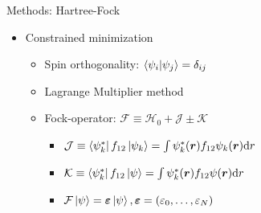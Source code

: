 \documentclass[10pt, t, xcolor=dvipsnames]{beamer}
\begin{document}
\begin{frame}[fragile]{Methods: Hartree-Fock}
    \begin{itemize}
        \item Constrained minimization
            \begin{itemize}
                \item Spin orthogonality: $\braket{\psi_i}{\psi_j} =
                    \delta_{ij}$
                \item Lagrange Multiplier method
                \item Fock-operator: $\mathcal{F} \equiv \mathcal{H}_0 +
                    \mathcal{J} \pm \mathcal{K}$
                    \begin{itemize}
                        \item $\mathcal{J} \equiv
                            \bra{\psi^{*}_k}f_{12}\ket{\psi_k} = \int
                            \psi^{*}_k(\bm{{r}})f_{12}\psi_k(\bm{{r}})\mathrm{d} r$
                        \vsp
                        \item $\mathcal{K} \equiv
                            \bra{\psi^{*}_k}f_{12}\ket{\psi} = \int
                            \psi^{*}_k(\bm{{r}})f_{12}\psi(\bm{{r}})\mathrm{d} r$
                        \vsp
                        \item $\mathcal{F}\ket{\psi} = \bm{{\varepsilon}}\ket{\psi},
                            \bm{{\varepsilon}}=(\varepsilon_0,\dots,\varepsilon_N)$
                    \end{itemize}
            \end{itemize}
    \end{itemize}
\end{frame}
\end{document}
